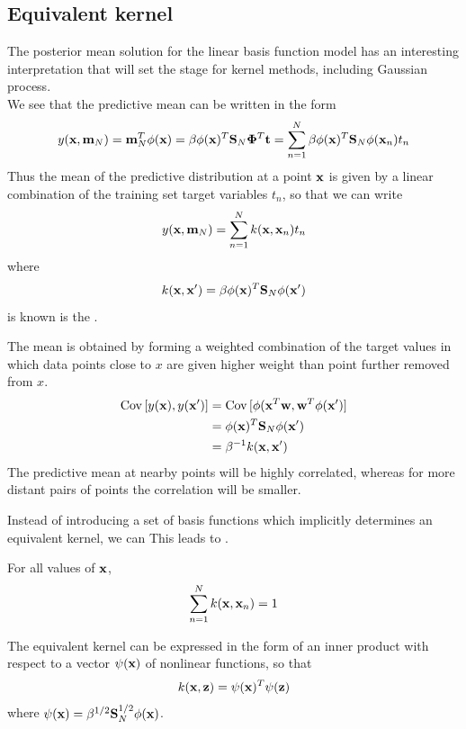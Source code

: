 \documentclass[11pt]{article}
\numberwithin{equation}{section}
\newcommand{\dm}[0]{\mathbf{\Phi}}
\begin{document}
\subsection{Equivalent kernel}
The posterior mean solution for the linear basis function model has an interesting interpretation that will set the stage for kernel methods, including Gaussian process.\\
We see that the predictive mean can be written in the form
\begin{equation}
	y(\vx, \vm_N) = \vm^T_N\phi(\vx) = \beta\phi(\vx)^T\tb{S}_N\dm^T\vt = \sum_{n=1}^N\beta \phi(\vx)^T\tb{S}_N\phi(\vx_n)t_n
\end{equation}
Thus the mean of the predictive distribution at a point $\textbf{x}$ is given by a linear combination of the training set target variables $t_n$, so that we can write
\begin{equation}
	y(\textbf{x}, \textbf{m}_N) = \sum_{n=1}^N k(\textbf{x}, \textbf{x}_n)t_n
\end{equation}
where
\begin{equation}
	k(\textbf{x}, \textbf{x}') = \beta \phi(\textbf{x})^T\textbf{S}_N\phi(\textbf{x}')
\end{equation}
is known is the .

\remark
The mean is obtained by forming a weighted combination of the target values in which data points close to $x$ are given higher weight than point further removed from $x$.
\property
\begin{align}
	\operatorname{Cov}{[}y(\textbf{x}), y(\textbf{x}')] &= \operatorname{Cov}{[}\phi(\textbf{x}^T\textbf{w}, \textbf{w}^T\phi(\textbf{x}')] \\
	 &= \phi(\textbf{x})^T\textbf{S}_N\phi(\textbf{x}') \\
	 &= \beta^{-1}k(\textbf{x}, \textbf{x}')
\end{align}
\remark
The predictive mean at nearby points will be highly correlated, whereas for more distant pairs of points the correlation will be smaller.

\remark
Instead of introducing a set of basis functions which implicitly determines an equivalent kernel, we can  This leads to .

\property
For all values of $\textbf{x}$,
\begin{equation}
	\sum_{n=1}^N k(\textbf{x}, \textbf{x}_n) = 1
\end{equation}

\property
The equivalent kernel can be expressed in the form of an inner product with respect to a vector $\psi(\textbf{x})$ of nonlinear functions, so that
\begin{equation}
	k(\textbf{x}, \textbf{z}) = \psi(\textbf{x})^T\psi(\textbf{z})
\end{equation}
where $\psi(\textbf{x}) = \beta^{1/2}\textbf{S}^{1/2}_N\phi(\textbf{x})$.
\end{document}
